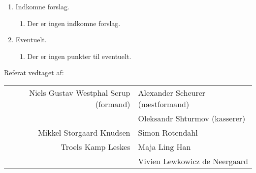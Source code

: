 \documentclass[a4paper]{article}
\begin{document}
\begin{enumerate}
\begin{enumerate}
\begin{enumerate}
\end{enumerate}

\end{enumerate}

\item[\textsection 9] Indkomne forslag.

\begin{enumerate}

\item Der er ingen indkomne forslag.

\end{enumerate}

\item[\textsection 10] Eventuelt.

\begin{enumerate}

\item Der er ingen punkter til eventuelt.

\end{enumerate}

\end{enumerate}

\vfill\noindent Referat vedtaget af:\\

\begin{center}
\begin{tabular}{rl}
Niels Gustav Westphal Serup (formand) \hspace{4mm}&\hspace{4mm} Alexander Scheurer (næstformand)\\[10mm]
&\hspace{-28mm}Oleksandr Shturmov (kasserer)\\[10mm]
Mikkel Storgaard Knudsen \hspace{4mm}&\hspace{4mm} Simon Rotendahl\\[10mm]
Troels Kamp Leskes \hspace{4mm}&\hspace{4mm} Maja Ling Han\\[10mm]
&\hspace{-28mm}Vivien Lewkowicz de Neergaard\\[10mm]
\end{tabular}
\end{center}
\end{document}

